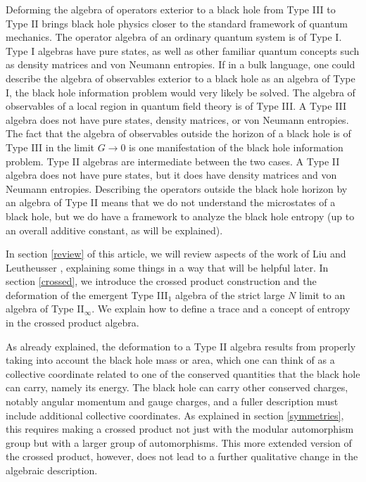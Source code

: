 \documentclass[11pt,a4paper]{article}
\begin{document}
Deforming the algebra of operators exterior to a black hole from Type III to Type II  brings black hole physics closer to the standard framework of quantum mechanics.
The operator algebra of an ordinary quantum system is of Type I.  Type I algebras have pure states, as well as other familiar quantum concepts such as density
matrices and von Neumann entropies.   If in a bulk language,
one could describe the algebra of observables exterior to a black hole as an algebra of Type I, the black hole information
problem would very likely be solved.   The algebra of observables of a local region in quantum field theory is of Type III.   A Type III algebra does not
have pure states,  density matrices, or von Neumann entropies.   The fact that the algebra of observables outside the horizon of a black hole is of Type III in the limit
$G\to 0$
is one manifestation of the black hole information problem.   Type II algebras are intermediate between the two cases.   A Type II algebra does not have pure states,
but it does have density matrices and von Neumann entropies.    Describing the operators outside the black hole horizon by an algebra of Type II means that we
do not understand the microstates of a black hole, but we do have a framework to analyze the black hole entropy (up to an overall additive constant, as will be explained).

In section \ref{review} of this article, we will review aspects of the work of Liu and Leutheusser \cite{LL,LL2}, explaining some things in a way that will be helpful later.
In section \ref{crossed}, we introduce the crossed product construction and the deformation of the emergent Type III$_1$ algebra of the strict large $N$ limit
to an algebra of Type II$_\infty$.   We explain how to define a trace and a concept of entropy in the crossed product algebra.

As already explained, the  deformation to a Type II algebra results from properly taking into account the black hole mass or area, which one
can think of as a collective coordinate related to one of the conserved quantities that the black hole can carry, namely its energy.    The black hole can carry
other conserved charges, notably angular momentum and gauge charges, and a fuller description must include additional collective coordinates.
 As explained in section \ref{symmetries}, this requires making a crossed
product not just with the modular automorphism group but with a larger group of automorphisms.  This more extended version of the crossed product, however,
does not lead to a further qualitative change in the algebraic description.
\end{document}
